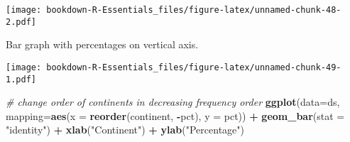 \documentclass[]{book}
\newenvironment{Shaded}{\begin{snugshade}}{\end{snugshade}}
\newcommand{\KeywordTok}[1]{\textcolor[rgb]{0.13,0.29,0.53}{\textbf{#1}}}
\newcommand{\DataTypeTok}[1]{\textcolor[rgb]{0.13,0.29,0.53}{#1}}
\newcommand{\DecValTok}[1]{\textcolor[rgb]{0.00,0.00,0.81}{#1}}
\newcommand{\StringTok}[1]{\textcolor[rgb]{0.31,0.60,0.02}{#1}}
\newcommand{\CommentTok}[1]{\textcolor[rgb]{0.56,0.35,0.01}{\textit{#1}}}
\newcommand{\OperatorTok}[1]{\textcolor[rgb]{0.81,0.36,0.00}{\textbf{#1}}}
\newcommand{\NormalTok}[1]{#1}
\begin{document}
\texttt{[image: bookdown-R-Essentials\_files/figure-latex/unnamed-chunk-48-2.pdf]}

Bar graph with percentages on vertical axis.

\begin{Shaded}
\end{Shaded}

\texttt{[image: bookdown-R-Essentials\_files/figure-latex/unnamed-chunk-49-1.pdf]}

\begin{Shaded}
\begin{Highlighting}[]
\CommentTok{# change order of continents in decreasing frequency order}
\KeywordTok{ggplot}\NormalTok{(}\DataTypeTok{data=}\NormalTok{ds, }\DataTypeTok{mapping=}\KeywordTok{aes}\NormalTok{(}\DataTypeTok{x =} \KeywordTok{reorder}\NormalTok{(continent, }\OperatorTok{-}\NormalTok{pct), }\DataTypeTok{y =}\NormalTok{ pct)) }\OperatorTok{+}\StringTok{ }
\StringTok{  }\KeywordTok{geom_bar}\NormalTok{(}\DataTypeTok{stat =} \StringTok{"identity"}\NormalTok{) }\OperatorTok{+}\StringTok{ }
\StringTok{  }\KeywordTok{xlab}\NormalTok{(}\StringTok{"Continent"}\NormalTok{) }\OperatorTok{+}\StringTok{ }\KeywordTok{ylab}\NormalTok{(}\StringTok{"Percentage"}\NormalTok{)}
\end{Highlighting}
\end{Shaded}
\end{document}
